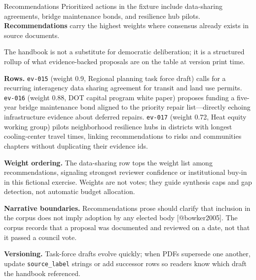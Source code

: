 \documentclass[
  ignorenonframetext,
]{beamer}
\author{\texorpdfstring{}{}}
\date{}
\begin{document}
\begin{frame}[fragile]{Recommendations}
\protect{}\label{recommendations}
Prioritized actions in the fixture include data-sharing agreements,
bridge maintenance bonds, and resilience hub pilots.
\textbf{Recommendations} carry the highest weights where consensus
already exists in source documents.

The handbook is not a substitute for democratic deliberation; it is a
structured rollup of what evidence-backed proposals are on the table at
version print time.

\textbf{Rows.} \texttt{ev-015} (weight 0.9, Regional planning task force
draft) calls for a recurring interagency data sharing agreement for
transit and land use permits. \texttt{ev-016} (weight 0.88, DOT capital
program white paper) proposes funding a five-year bridge maintenance
bond aligned to the priority repair list---directly echoing
infrastructure evidence about deferred repairs. \texttt{ev-017} (weight
0.72, Heat equity working group) pilots neighborhood resilience hubs in
districts with longest cooling-center travel times, linking
recommendations to risks and communities chapters without duplicating
their evidence ids.

\textbf{Weight ordering.} The data-sharing row tops the weight list
among recommendations, signaling strongest reviewer confidence or
institutional buy-in in this fictional exercise. Weights are not votes;
they guide synthesis caps and gap detection, not automatic budget
allocation.

\textbf{Narrative boundaries.} Recommendations prose should clarify that
inclusion in the corpus does not imply adoption by any elected body
{[}@bowker2005{]}. The corpus records that a proposal was documented and
reviewed on a date, not that it passed a council vote.

\textbf{Versioning.} Task-force drafts evolve quickly; when PDFs
supersede one another, update \texttt{source\_label} strings or add
successor rows so readers know which draft the handbook referenced.
\end{frame}
\end{document}
